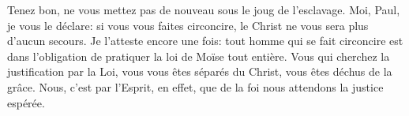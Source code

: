 Tenez bon, ne vous mettez pas de nouveau sous le joug de l’esclavage.
Moi, Paul, je vous le déclare:
	si vous vous faites circoncire, le Christ ne vous sera plus d’aucun secours.
Je l’atteste encore une fois:
	tout homme qui se fait circoncire
	est dans l’obligation de pratiquer la loi de Moïse tout entière.
Vous qui cherchez la justification par la Loi,
	vous vous êtes séparés du Christ, vous êtes déchus de la grâce.
Nous, c’est par l’Esprit, en effet, que de la foi nous attendons la justice espérée.
